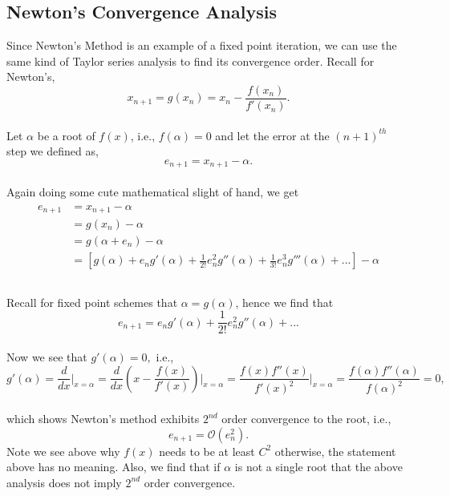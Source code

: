 \documentclass[paper=a4, fontsize=11pt]{scrartcl} %
\numberwithin{equation}{section} %
\numberwithin{figure}{section} %
\numberwithin{table}{section} %
\begin{document}
%
%
\subsection{Newton's Convergence Analysis}

Since Newton's Method is an example of a fixed point iteration, we can use the same kind of Taylor series analysis to find its convergence order. Recall for Newton's, \\

$$x_{n+1} = g(x_n) = x_n - \frac{ f(x_n) }{ f'(x_n) }.$$\\

Let $\alpha$ be a root of $f(x)$, i.e., $f(\alpha)=0$ and let the error at the $(n+1)^{th}$ step we defined as, $$e_{n+1} = x_{n+1} - \alpha.$$\\
Again doing some cute mathematical slight of hand, we get\\

\begin{align} 
\nonumber
\begin{split}
e_{n+1}&= x_{n+1} - \alpha \\
&= g(x_n) - \alpha \\
&=g(\alpha + e_n)  - \alpha \\
&=\left[g(\alpha) + e_n g'(\alpha) + \frac{1}{2!} e_n^2 g''(\alpha) + \frac{1}{3!} e_n^3 g'''(\alpha) + ... \right] - \alpha \\
\end{split}					
\end{align}\\

Recall for fixed point schemes that $\alpha = g(\alpha)$, hence we find that \\

$$e_{n+1} = e_n g'(\alpha)  + \frac{1}{2!} e_n^2 g''(\alpha) + ... $$\\

Now we see that $g'(\alpha)=0,$ i.e.,\\

$$g'(\alpha) = \frac{d}{dx}\Bigg|_{x=\alpha} = \frac{d}{dx} \left( x - \frac{ f(x) }{ f'(x) } \right)\Bigg|_{x=\alpha} = \frac{ f(x) f''(x) }{ f'(x)^2 } \Bigg|_{x=\alpha} = \frac{ f(\alpha) f''(\alpha) }{ f(\alpha)^2 } = 0,$$\\

which shows Newton's method exhibits $2^{nd}$ order convergence to the root, i.e., $$e_{n+1} = \mathcal{O}(e_n^2).$$ Note we see above why $f(x)$ needs to be at least $C^2$ otherwise, the statement above has no meaning. Also, we find that if $\alpha$ is not a single root that the above analysis does not imply $2^{nd}$ order convergence. \\
\end{document}
